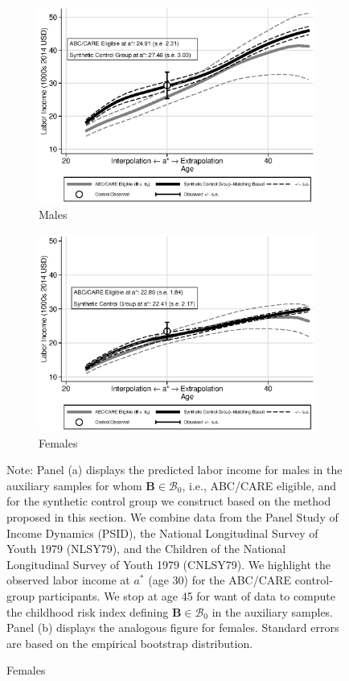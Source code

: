 \begin{figure}
\centering
\caption{Labor Income Profile, Disadvantaged Individuals Synthetic Control Group in the Auxiliary Samples}\label{figure:controltests}
\begin{subfigure}[h]{0.5\textwidth}
		\centering
		\caption{Males}
		\includegraphics[width=\textwidth]{output/abccare_disad_1.eps}
\end{subfigure}%
\begin{subfigure}[h]{0.5\textwidth}
		\centering
		\caption{Females}
		\includegraphics[width=\textwidth]{output/abccare_disad_0.eps}
\end{subfigure}
\footnotesize \justify
Note: Panel (a) displays the predicted labor income for males in the auxiliary samples for whom $\bm{B} \in \mathcal{B}_0$, i.e., ABC/CARE eligible, and for the synthetic control group we construct based on the method proposed in this section. We combine data from the Panel Study of Income Dynamics (PSID), the National Longitudinal Survey of Youth 1979 (NLSY79), and the Children of the National Longitudinal Survey of Youth 1979 (CNLSY79). We highlight the observed labor income at $a^*$ (age 30) for the ABC/CARE control-group participants. We stop at age 45 for want of data to compute the childhood risk index defining $\bm{B} \in \mathcal{B}_0$ in the auxiliary samples. Panel (b) displays the analogous figure for females. Standard errors are based on the empirical bootstrap distribution. 
\end{figure}

